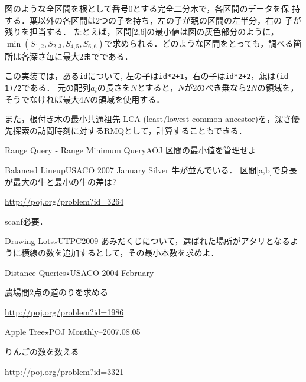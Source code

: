 \begin{versionbeta}
図のような全区間を根として番号0とする完全二分木で，各区間のデータを保
持する．葉以外の各区間は2つの子を持ち，左の子が親の区間の左半分，右の
子が残りを担当する．
たとえば，区間[2,6]の最小値は図の灰色部分のように，$\min(S_{1,2},S_{2,3},S_{4,5},S_{6,6})$で求められる．どのような区間をとっても，調べる箇所は各深さ毎に最大2までである．


この実装では，ある\texttt{id}について, 左の子は\texttt{id*2+1}，右の子は\texttt{id*2+2}，親は\texttt{(id-1)/2}である．
元の配列$a_i$の長さを$N$とすると，$N$が2のべき乗なら$2N$の領域を，そうでなければ最大$4N$の領域を使用する．

また，根付き木の最小共通祖先
LCA (least/lowest common ancestor)を，深さ優先探索の訪問時刻に対するRMQとして，計算することもできる．
\pccbook[pp.~292--]

\begin{pbox}{Range Query - Range Minimum Query}{AOJ}
区間の最小値を管理せよ

\end{pbox}

\begin{pbox}{Balanced Lineup}{USACO 2007 January Silver}
牛が並んでいる． 区間[a,b]で身長が最大の牛と最小の牛の差は?

\url{http://poj.org/problem?id=3264}
\end{pbox}

scanf必要．

\begin{pbox}{Drawing Lots$\star$}{UTPC2009}
あみだくじについて，選ばれた場所がアタリとなるように横線の数を追加するとして，その最小本数を求めよ．

\end{pbox}

\begin{pbox}{Distance Queries$\star$}{USACO 2004 February}

農場間2点の道のりを求める

\url{http://poj.org/problem?id=1986}
\end{pbox}


\begin{pbox}{Apple Tree$\star$}{POJ Monthly--2007.08.05}

りんごの数を数える

\url{http://poj.org/problem?id=3321}
\end{pbox}

\end{versionbeta}

